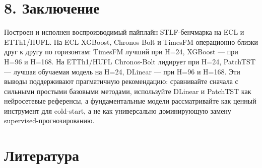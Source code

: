 \section{8.
Заключение}\label{ux437ux430ux43aux43bux44eux447ux435ux43dux438ux435}

Построен и исполнен воспроизводимый пайплайн STLF-бенчмарка на ECL и
ETTh1/HUFL. На ECL XGBoost, Chronos-Bolt и TimesFM операционно близки
друг к другу по горизонтам: TimesFM лучший при H=24, XGBoost --- при
H=96 и H=168. На ETTh1/HUFL Chronos-Bolt лидирует при H=24, PatchTST ---
лучшая обучаемая модель на H=24, DLinear --- при H=96 и H=168. Эти
выводы поддерживают прагматичную рекомендацию: сравнивайте сначала с
сильными простыми базовыми методами, используйте DLinear и PatchTST как
нейросетевые референсы, а фундаментальные модели рассматривайте как
ценный инструмент для cold-start, а не как универсально доминирующую
замену supervised-прогнозированию.

\section*{Литература}\label{ux43bux438ux442ux435ux440ux430ux442ux443ux440ux430}

